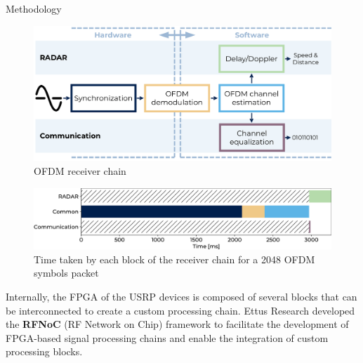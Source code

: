 \documentclass[final]{beamer}
\newlength{\onecolwid}
\begin{document}
\begin{frame}[t,fragile]
\begin{columns}[t]
\begin{column}{\onecolwid}
\begin{block}{Methodology}
    \vspace{0.1in}

    \begin{figure}[!ht]
      \centering
      \includegraphics[width=\linewidth]{img/ofdm_reciever_chain_h.pdf}
      \caption{OFDM receiver chain}
    \end{figure}


    \begin{figure}[!ht]
      \centering
      \includegraphics[width=\linewidth]{../../experiments/01/complexity.png}
      \caption{Time taken by each block of the receiver chain for a 2048 OFDM symbols packet}
    \end{figure}


  \vspace{0.3in}

    Internally, the FPGA of the USRP devices is composed of several blocks that can be interconnected to create a custom processing chain. 
    Ettus Research developed the \textbf{RFNoC} (RF Network on Chip) framework to facilitate the development of FPGA-based signal processing chains and enable the integration of custom processing blocks.


\end{block}
\end{column}
\end{columns}
\end{frame}
\end{document}
